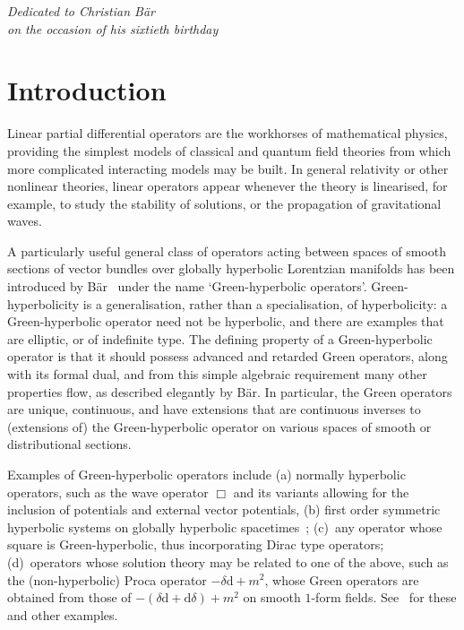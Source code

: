 \documentclass[pdftex]{sigma}
\numberwithin{equation}{section}
\newcommand{\dd}{\mathrm{d}}
\begin{document}
		


\begin{flushright}
\begin{minipage}{65mm}
\em Dedicated to Christian B\"ar\\ on the occasion of his sixtieth birthday
\end{minipage}
\end{flushright}

\renewcommand{\thefootnote}{\arabic{footnote}}
\setcounter{footnote}{0}

 \section{Introduction}

 Linear partial differential operators are the workhorses of mathematical physics, providing the
 simplest models of classical and quantum field theories from which more complicated interacting models may be built. In general relativity or other nonlinear theories, linear operators appear whenever the theory is linearised, for example, to study the stability of solutions, or the propagation of gravitational waves.

 A particularly useful general class of operators acting between spaces of smooth sections of vector bundles over globally hyperbolic Lorentzian manifolds has been introduced by B\"ar~\cite{Baer:2015} under the name `Green-hyperbolic operators'. Green-hyperbolicity is a generalisation, rather than a specialisation, of hyperbolicity: a Green-hyperbolic operator need not be hyperbolic, and there are examples that are elliptic, or of indefinite type. The defining property of a Green-hyperbolic operator is that it should possess advanced and retarded Green operators, along with its formal dual, and from this simple algebraic requirement many other properties flow, as described elegantly by B\"ar. In particular, the Green operators are unique, continuous, and have extensions that are continuous inverses to
 (extensions of) the Green-hyperbolic operator on various spaces of smooth or distributional sections.

 Examples of Green-hyperbolic operators include (a) normally hyperbolic operators, such as the
 wave operator $\Box$ and its variants allowing for the inclusion of potentials and external vector potentials, (b) first order symmetric hyperbolic systems on
 globally hyperbolic spacetimes~\cite{Baer:2015}; (c)~any operator whose square is Green-hyperbolic, thus incorporating Dirac type operators; (d)~operators whose solution theory may be related to one of the above, such as the (non-hyperbolic) Proca operator $-\delta\dd+m^2$, whose Green operators are obtained from those of ${-(\delta\dd+\dd\delta)+m^2}$ on smooth $1$-form fields. See~\cite{Baer:2015} for these and other examples.
\end{document}
